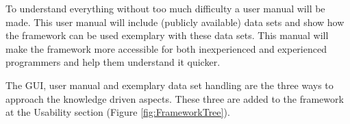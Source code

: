 \documentclass[10pt,a4paper]{article}
\begin{document}
	To understand everything without too much difficulty a user manual will be made. This user manual will include (publicly available) data sets and show how the framework can be used exemplary with these data sets. This manual will make the framework more accessible for both inexperienced and experienced programmers and help them understand it quicker.
	
	The GUI, user manual and exemplary data set handling are the three ways to approach the knowledge driven aspects. These three are added to the framework at the Usability section (Figure \ref{fig:FrameworkTree}).
	
	 
	
	
	\appendix
	
\end{document}

